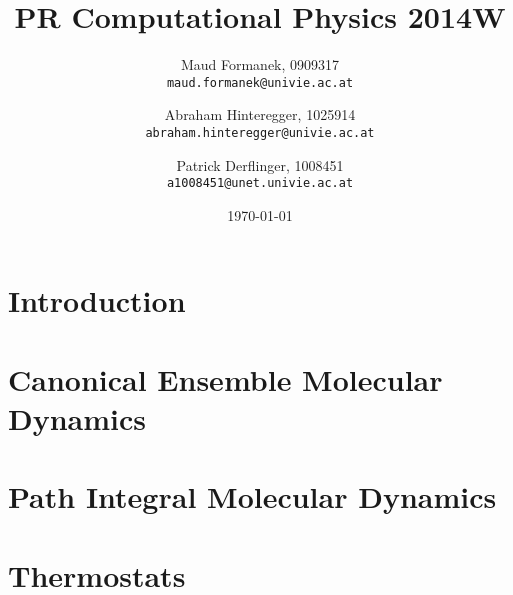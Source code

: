 \documentclass[a4paper]{article}
\title{PR Computational Physics 2014W}
\author{
	Maud Formanek, 0909317\\
    \texttt{maud.formanek@univie.ac.at}
	\and
    Abraham Hinteregger,  1025914\\
    \texttt{abraham.hinteregger@univie.ac.at}\and
    Patrick Derflinger,  1008451\\
    \texttt{a1008451@unet.univie.ac.at}
    }
\date{\today}
\begin{document}
\maketitle
\tableofcontents

\newpage

\section{Introduction} \label{intro}

\section{Canonical Ensemble Molecular Dynamics} \label{cemd}

\section{Path Integral Molecular Dynamics} \label{pimd}

\section{Thermostats} \label{thermostats}







\end{document}

